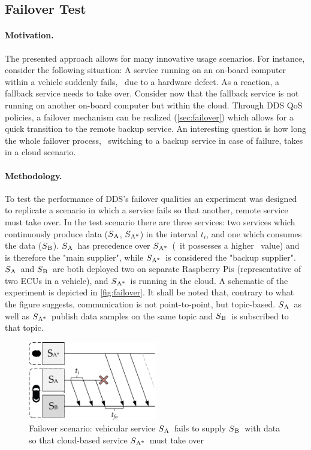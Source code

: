 \subsection{Failover Test}\label{sec:failovertest}
\paragraph{Motivation.} The presented approach allows for many innovative usage scenarios. For instance, consider the following situation: A service running on an on-board computer within a vehicle suddenly fails, \eg\ due to a hardware defect. As a reaction, a fallback service needs to take over. Consider now that the fallback service is not running on another on-board computer but within the cloud. Through DDS QoS policies, a failover mechanism can be realized (\cf \ref{sec:failover}) which allows for a quick transition to the remote backup service. An interesting question is how long the whole failover process, \ie\ switching to a backup service in case of failure, takes in a cloud scenario.

\newcommand{\proda}{$S\textsubscript{A}$}
\newcommand{\prodb}{$S\textsubscript{A*}$}
\newcommand{\cons}{$S\textsubscript{B}$}

\paragraph{Methodology.} To test the performance of DDS's failover qualities an experiment was designed to replicate a scenario in which a service fails so that another, remote service must take over. In the test scenario there are three services: two services which continuously produce data (\proda , \prodb) in the interval $t_i$, and one which consumes the data (\cons). \proda\ has precedence over \prodb\ (\ie\ it possesses a higher \ownership\ value) and is therefore the "main supplier", while \prodb\ is considered the "backup supplier". \proda\ and \cons\ are both deployed two on separate Raspberry Pis (representative of two ECUs in a vehicle), and \prodb\ is running in the cloud. A schematic of the experiment is depicted in \autoref{fig:failover}. It shall be noted that, contrary to what the figure suggests, communication is not point-to-point, but topic-based. \proda\ as well as \prodb\ publish data samples on the same topic and \cons\ is subscribed to that topic.
\begin{figure}[htpb]
  \centering
  \includegraphics[width=0.5\textwidth]{figures/takeover}
  \caption[Failover experiment schematic]{Failover scenario: vehicular service \proda\ fails to supply \cons\ with data so that cloud-based service \prodb\ must take over}\label{fig:failover}
\end{figure}

